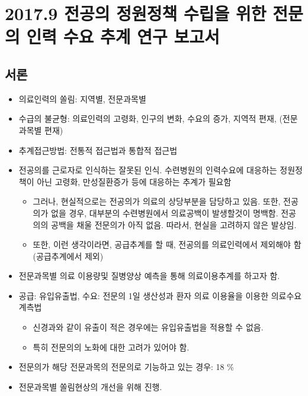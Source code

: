 \documentclass[]{book}
\providecommand{\tightlist}{%
  \setlength{\itemsep}{0pt}\setlength{\parskip}{0pt}}
\begin{document}
\hypertarget{section-2}{%
\section{2017.9 전공의 정원정책 수립을 위한 전문의 인력 수요 추계 연구 보고서}\label{section-2}}

\hypertarget{section-3}{%
\subsection{서론}\label{section-3}}

\begin{itemize}
\item
  의료인력의 쏠림: 지역별, 전문과목별
\item
  수급의 불균형: 의료인력의 고령화, 인구의 변화, 수요의 증가, 지역적 편재, (전문과목별 편재)
\item
  추계접근방법: 전통적 접근법과 통합적 접근법
\item
  전공의를 근로자로 인식하는 잘못된 인식. 수련병원의 인력수요에 대응하는 정원정책이 아닌 고령화, 만성질환증가 등에 대응하는 추계가 필요함

  \begin{itemize}
  \tightlist
  \item
    그러나, 현실적으로는 전공의가 의료의 상당부분을 담당하고 있음. 또한, 전공의가 없을 경우, 대부분의 수련병원에서 의료공백이 발생할것이 명백함. 전공의의 공백을 채울 전문의가 아직 없음. 따라서, 현실을 고려하지 않은 발상임.
  \item
    또한, 이런 생각이라면, 공급추계를 할 때, 전공의를 의료인력에서 제외해야 함 (공급추계에서 제외)
  \end{itemize}
\item
  전문과목별 의료 이용량및 질병양상 예측을 통해 의료이용추계를 하고자 함.
\item
  공급: 유입유출법, 수요: 전문의 1일 생산성과 환자 의료 이용율을 이용한 의료수요 계측법

  \begin{itemize}
  \tightlist
  \item
    신경과와 같이 유출이 적은 경우에는 유입유출법을 적용할 수 없음.
  \item
    특히 전문의의 노화에 대한 고려가 있어야 함.
  \end{itemize}
\item
  전문의가 해당 전문과목의 전문의로 기능하고 있는 경우: 18 \%
\item
  전문과목별 쏠림현상의 개선을 위해 진행.


\end{itemize}
\end{document}
